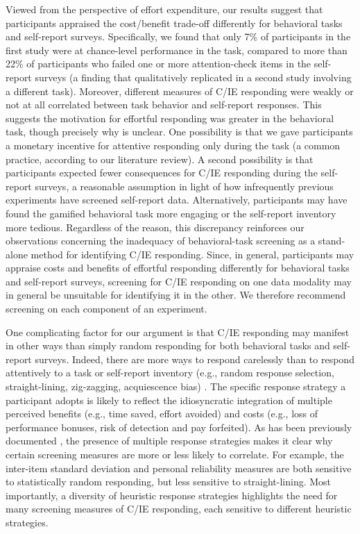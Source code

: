 \documentclass[a4paper,notitlepage,12pt]{article}
\begin{document}
\begin{refsection}[main]
Viewed from the perspective of effort expenditure, our results suggest that participants appraised the cost/benefit trade-off differently for behavioral tasks and self-report surveys. Specifically, we found that only 7\% of participants in the first study were at chance-level performance in the task, compared to more than 22\% of participants who failed one or more attention-check items in the self-report surveys (a finding that qualitatively replicated in a second study involving a different task). Moreover, different measures of C/IE responding were weakly or not at all correlated between task behavior and self-report responses. This suggests the motivation for effortful responding was greater in the behavioral task, though precisely why is unclear. One possibility is that we gave participants a monetary incentive for attentive responding only during the task (a common practice, according to our literature review). A second possibility is that participants expected fewer consequences for C/IE responding during the self-report surveys, a reasonable assumption in light of how infrequently previous experiments have screened self-report data. Alternatively, participants may have found the gamified behavioral task more engaging or the self-report inventory more tedious. Regardless of the reason, this discrepancy reinforces our observations concerning the inadequacy of behavioral-task screening as a stand-alone method for identifying C/IE responding. Since, in general, participants may appraise costs and benefits of effortful responding differently for behavioral tasks and self-report surveys, screening for C/IE responding on one data modality may in general be unsuitable for identifying it in the other. We therefore recommend screening on each component of an experiment.

One complicating factor for our argument is that C/IE responding may manifest in other ways than simply random responding for both behavioral tasks and self-report surveys. Indeed, there are more ways to respond carelessly than to respond attentively to a task or self-report inventory (e.g., random response selection, straight-lining, zig-zagging, acquiescence bias) \cite{curran2016methods}. The specific response strategy a participant adopts is likely to reflect the idiosyncratic integration of multiple perceived benefits (e.g., time saved, effort avoided) and costs (e.g., loss of performance bonuses, risk of detection and pay forfeited). As has been previously documented \cite{desimone2018dirty}, the presence of multiple response strategies makes it clear why certain screening measures are more or less likely to correlate. For example, the inter-item standard deviation and personal reliability measures are both sensitive to statistically random responding, but less sensitive to straight-lining. Most importantly, a diversity of heuristic response strategies highlights the need for many screening measures of C/IE responding, each sensitive to different heuristic strategies. 


\end{refsection}
\end{document}
